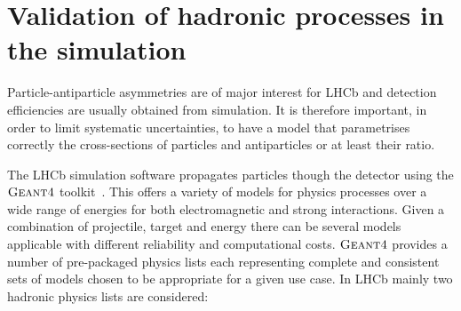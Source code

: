 \section{Validation of hadronic processes in the simulation}
\label{sec:validation}

Particle-antiparticle asymmetries are of major interest for LHCb and detection efficiencies are usually obtained from simulation.
It is therefore important, in order to limit systematic uncertainties, to have a model that parametrises
correctly the cross-sections of particles and antiparticles or at least their ratio.

The LHCb simulation software propagates particles though the detector using the $\textsc{Geant4}$ toolkit~\cite{Alves:2008zz}.
This offers a variety of models for physics processes over a wide range of energies for both electromagnetic and strong interactions.
Given a combination of projectile, target and energy there can be several models applicable with different reliability
and computational costs. $\textsc{Geant4}$ provides a number of pre-packaged physics lists each representing
complete and consistent sets of models chosen to be appropriate for a given use case. In LHCb mainly two hadronic
physics lists are considered:
%
